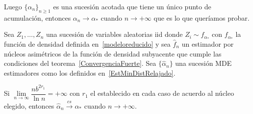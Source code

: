 \begin{dem}
	
	Luego $\{\alpha_{n}\}_{n \ge 1}$ es una sucesión acotada que tiene un único punto de acumulación, entonces $\alpha_{n} \to \alpha_*$ cuando $n \to +\infty$ que es lo que queríamos probar.
\end{dem}

\begin{theorem}
	Sea $Z_1, \ldots, Z_n$ una sucesión de variables aleatorias iid donde $Z_i \sim f_{\alpha_{*}}$ con $f_{\alpha_{*}}$ la función de densidad definida en~\eqref{modeloreducido} y sea $\widehat{f}_n$ un estimador por núcleos asimétricos de la función de densidad subyacente que cumple las condiciones del teorema~\ref{ConvergenciaFuerte}. Sea $\{\widehat{\alpha}_n\}$ una sucesión MDE estimadores como los definidos en~\eqref{EstMinDistRelajado}.
	
	Si $\lim\limits_{n \to \infty} \dfrac{n b^{2r_1}}{\ln{n}}  = +\infty $ con $r_1$ el establecido en cada caso de acuerdo al núcleo elegido, entonces $\widehat{\alpha}_n \stackrel{cs}{\longrightarrow} \alpha_{*}$ cuando $n \longrightarrow +\infty.$
\end{theorem}

